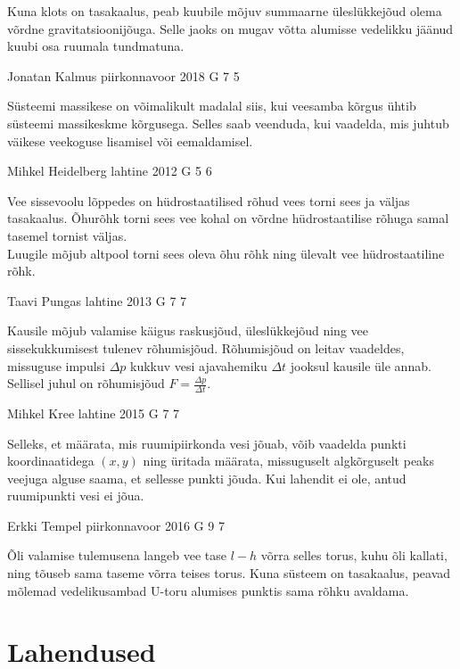 \documentclass[11pt, twoside]{article}
\begin{document}
{{\ifHint
Kuna klots on tasakaalus, peab kuubile mõjuv summaarne üleslükkejõud olema võrdne gravitatsioonijõuga. Selle jaoks on mugav võtta alumisse vedelikku jäänud kuubi osa ruumala tundmatuna.
\fi
}

{Jonatan Kalmus} %
{piirkonnavoor} %
{2018} %
{G 7} %
{5} %
{

\ifHint
Süsteemi massikese on võimalikult madalal siis, kui veesamba kõrgus ühtib süsteemi massikeskme kõrgusega. Selles saab veenduda, kui vaadelda, mis juhtub väikese veekoguse lisamisel või eemaldamisel.
\fi
}

{Mihkel Heidelberg} %
{lahtine} %
{2012} %
{G 5} %
{6} %
{

\ifHint
\osa Vee sissevoolu lõppedes on hüdrostaatilised rõhud vees torni sees ja väljas tasakaalus. Õhurõhk torni sees vee kohal on võrdne hüdrostaatilise rõhuga samal tasemel tornist väljas.\\
\osa Luugile mõjub altpool torni sees oleva õhu rõhk ning ülevalt vee hüdrostaatiline rõhk.
\fi
}

{Taavi Pungas} %
{lahtine} %
{2013} %
{G 7} %
{7} %
{

\ifHint
Kausile mõjub valamise käigus raskusjõud, üleslükkejõud ning vee sissekukkumisest tulenev rõhumisjõud. Rõhumisjõud on leitav vaadeldes, missuguse impulsi $\Delta p$ kukkuv vesi ajavahemiku $\Delta t$ jooksul kausile üle annab. Sellisel juhul on rõhumisjõud $F = \frac{\Delta p}{\Delta t}$.
\fi
}

{Mihkel Kree} %
{lahtine} %
{2015} %
{G 7} %
{7} %
{

\ifHint
Selleks, et määrata, mis ruumipiirkonda vesi jõuab, võib vaadelda punkti koordinaatidega $(x, y)$ ning üritada määrata, missuguselt algkõrguselt peaks veejuga alguse saama, et sellesse punkti jõuda. Kui lahendit ei ole, antud ruumipunkti vesi ei jõua.
\fi
}

{Erkki Tempel} %
{piirkonnavoor} %
{2016} %
{G 9} %
{7} %
{

\ifHint
Õli valamise tulemusena langeb vee tase $l - h$ võrra selles torus, kuhu õli kallati, ning tõuseb sama taseme võrra teises torus. Kuna süsteem on tasakaalus, peavad mõlemad vedelikusambad U-toru alumises punktis sama rõhku avaldama.
\fi
}
\newpage\section{Lahendused}
        \ToggleSolution
        
}
\end{document}
